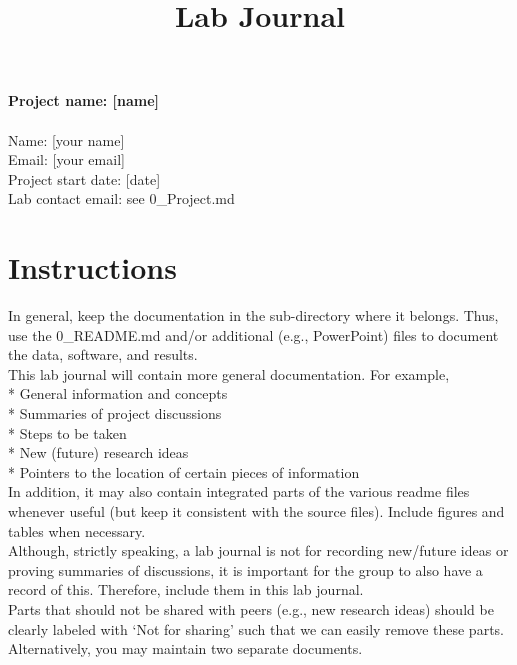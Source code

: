 ﻿\documentclass[12pt]{article}
\title{Lab Journal}
\date{}
\author{}
\begin{document}

\maketitle


\textbf{Project name: [name]}\\
\\
Name: [your name]\\
Email: [your email]\\
Project start date: [date]\\
Lab contact email: see 0\_Project.md\\

\tableofcontents

\section{Instructions}
In general, keep the documentation in the sub-directory where it belongs. Thus, use the 0_README.md and/or additional (e.g., PowerPoint) files to document the data, software, and results. \\

This lab journal will contain more general documentation. For example,\\
* General information and concepts\\
* Summaries of project discussions\\
* Steps to be taken\\
* New (future) research ideas\\
* Pointers to the location of certain pieces of information \\

In addition, it may also contain integrated parts of the various readme files whenever useful (but keep it consistent with the source files). Include figures and tables when necessary.\\

Although, strictly speaking, a lab journal is not for recording new/future ideas or proving summaries of discussions, it is important for the group to also have a record of this. Therefore, include them in this lab journal.\\

Parts that should not be shared with peers (e.g., new research ideas) should be clearly labeled with ‘Not for sharing’ such that we can easily remove these parts. Alternatively, you may maintain two separate documents.\\
\end{document}
